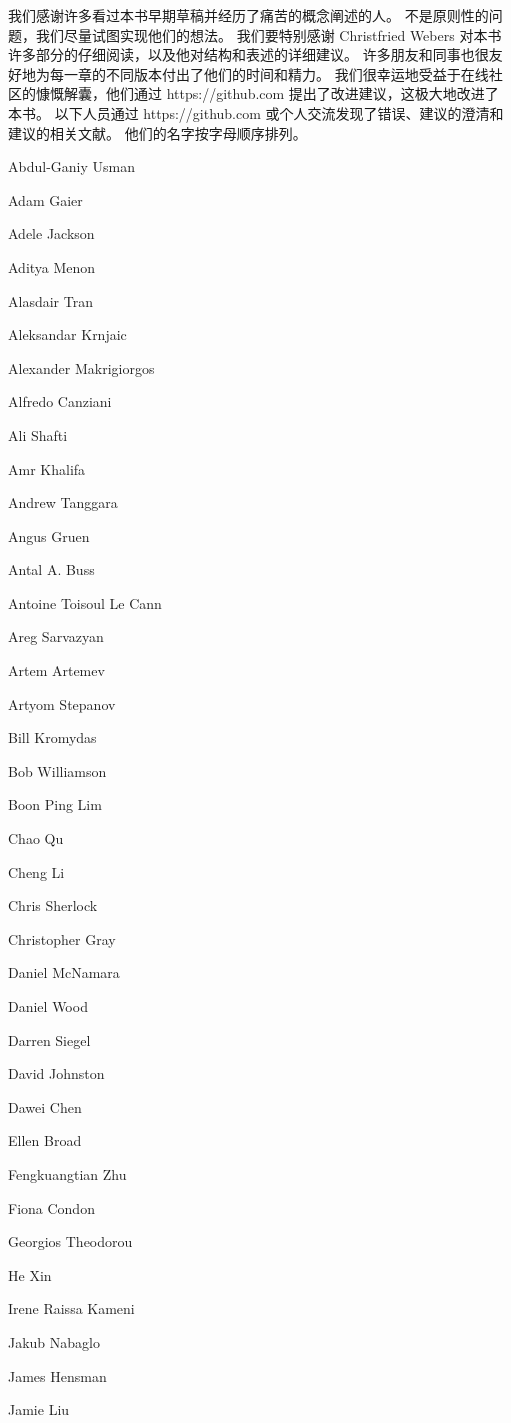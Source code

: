 我们感谢许多看过本书早期草稿并经历了痛苦的概念阐述的人。 不是原则性的问题，我们尽量试图实现他们的想法。 我们要特别感谢 Christfried Webers 对本书许多部分的仔细阅读，以及他对结构和表述的详细建议。 许多朋友和同事也很友好地为每一章的不同版本付出了他们的时间和精力。 我们很幸运地受益于在线社区的慷慨解囊，他们通过 https://github.com 提出了改进建议，这极大地改进了本书。 以下人员通过 https://github.com 或个人交流发现了错误、建议的澄清和建议的相关文献。 他们的名字按字母顺序排列。

Abdul-Ganiy Usman

Adam Gaier

Adele Jackson

Aditya Menon

Alasdair Tran

Aleksandar Krnjaic

Alexander Makrigiorgos

Alfredo Canziani

Ali Shafti

Amr Khalifa

Andrew Tanggara

Angus Gruen

Antal A. Buss

Antoine Toisoul Le Cann

Areg Sarvazyan

Artem Artemev

Artyom Stepanov

Bill Kromydas

Bob Williamson

Boon Ping Lim

Chao Qu

Cheng Li

Chris Sherlock

Christopher Gray

Daniel McNamara

Daniel Wood

Darren Siegel

David Johnston

Dawei Chen

Ellen Broad

Fengkuangtian Zhu

Fiona Condon

Georgios Theodorou

He Xin

Irene Raissa Kameni

Jakub Nabaglo

James Hensman

Jamie Liu

